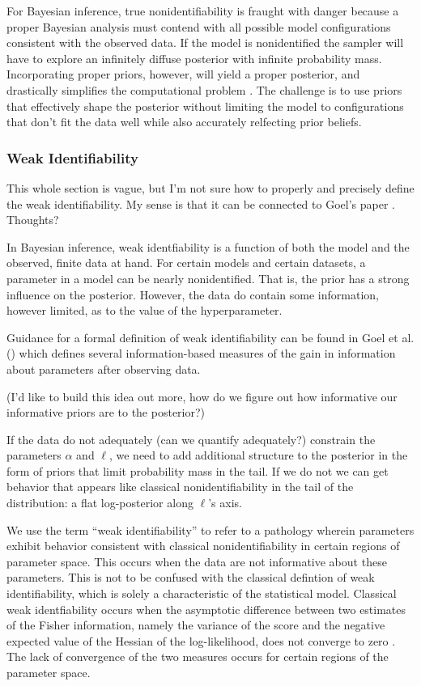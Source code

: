 \documentclass{article}
\begin{document}
For Bayesian inference, true nonidentifiability is fraught with danger because
a proper Bayesian analysis must contend with all possible model configurations
consistent with the observed data. If the model is nonidentified the sampler
will have to explore an infinitely diffuse posterior with infinite
probability mass. Incorporating proper priors, however, will yield a proper
posterior, and drastically simplifies the computational problem
\cite{xie2004note}. The challenge is to use priors that effectively shape the
posterior without limiting the model to configurations that don't fit the data
well while also accurately relfecting prior beliefs. 

\subsubsection{Weak Identifiability}

This whole section is vague, but I'm not sure how to properly and precisely
define the weak identifiability. My sense is that it can be connected to 
Goel's paper \cite{goel1981information}. Thoughts?

In Bayesian inference, weak identfiability is a function of both the model and
the observed, finite data at hand. For certain models and certain datasets, a
parameter in a model can be nearly nonidentified. That is, the prior has a
strong influence on the posterior. However, the data do contain some
information, however limited, as to the value of the hyperparameter. 

Guidance for a formal definition of weak identifiability can be found in Goel
et al.  (\cite{goel1981information}) which defines several information-based
measures of the gain in information about parameters after observing data. 

(I'd like to build this idea out more, how do we figure out how informative our
 informative priors are to the posterior?)

If the data do not adequately (can we quantify adequately?) constrain the
parameters $\alpha$ and $\ell$, we need to add additional structure to the
posterior in the form of priors that limit probability mass in the tail. If we
do not we can get behavior that appears like classical nonidentifiability in
the tail of the distribution: a flat log-posterior along $\ell$'s axis. 

We use the term ``weak identifiability'' to refer to a pathology wherein
parameters exhibit behavior consistent with classical nonidentifiability in
certain regions of parameter space. This occurs when the data are not
informative about these parameters.  This is not to be confused with the
classical defintion of weak identifiability, which is solely a characteristic
of the statistical model. Classical weak identfiability occurs when the
asymptotic difference between two estimates of the Fisher information, namely
the variance of the score and the negative expected value of the Hessian of the
log-likelihood, does not converge to zero \cite{andrews2015maximum}. The lack
of convergence of the two measures occurs for certain regions of the parameter
space.
\end{document}
